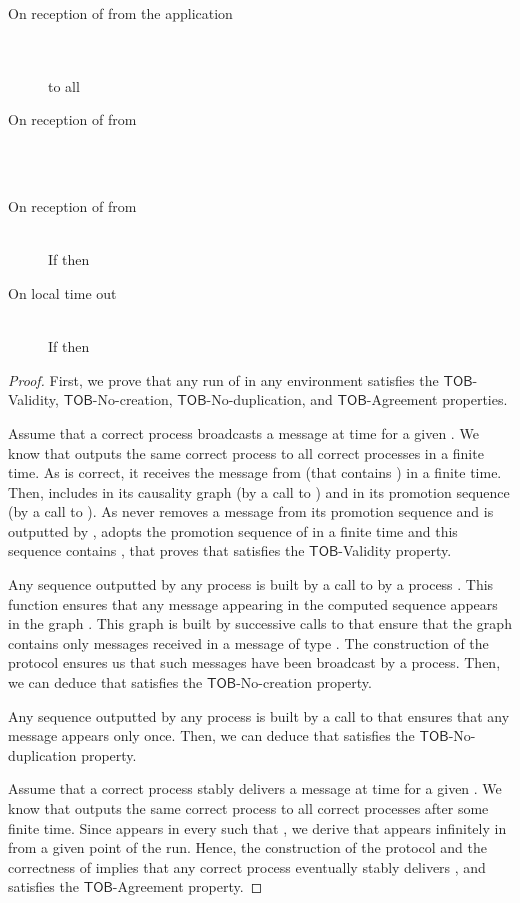 \documentclass[11pt]{article}
\newcommand{\TOB}{\ensuremath{\mathsf{TOB}}}
\begin{document}
{\begin{algorithm}[t]
\begin{description}
\item[On reception of  from the application]~\\
\\
  to all

\item[On reception of  from ]~\\
\\


\item[On reception of  from ]~\\
If  then\\


\item[On local time out]~\\
If  then\\


\end{description}
\normalsize
\end{algorithm}


\begin{proof}
First, we prove that any run  of  in any environment  satisfies the \TOB-Validity, \TOB-No-creation, \TOB-No-duplication, and \TOB-Agreement properties.

Assume that a correct process  broadcasts a message  at time  for a given . We know that  outputs the same correct process  to all correct processes in a finite time. As  is correct, it receives the message  from  (that contains ) in a finite time. Then,  includes  in its causality graph (by a call to ) and in its promotion sequence (by a call to ). As  never removes a message from its promotion sequence and is outputted by ,  adopts the promotion sequence of  in a finite time and this sequence contains , that proves that  satisfies the \TOB-Validity property.

Any sequence outputted by any process is built by a call to  by a process .  This function ensures that any message appearing in the computed sequence appears in the graph . This graph is built by successive calls to  that ensure that the graph contains only messages received in a message of type . The construction of the protocol ensures us that such messages have been broadcast by a process. Then, we can deduce that  satisfies the \TOB-No-creation property.

Any sequence outputted by any process is built by a call to  that ensures that any message appears only once. Then, we can deduce that  satisfies the \TOB-No-duplication property.

Assume that a correct process  stably delivers a message  at time 
for a given . We know that  outputs the same
correct process  to all correct processes after some finite
time. Since  appears in every  such that , we
derive that  appears infinitely in  from a given point
of the run. Hence, the construction of the protocol and the correctness
of  implies that any correct process eventually stably delivers
, and   satisfies the \TOB-Agreement property.


\end{proof}}
\end{document}
